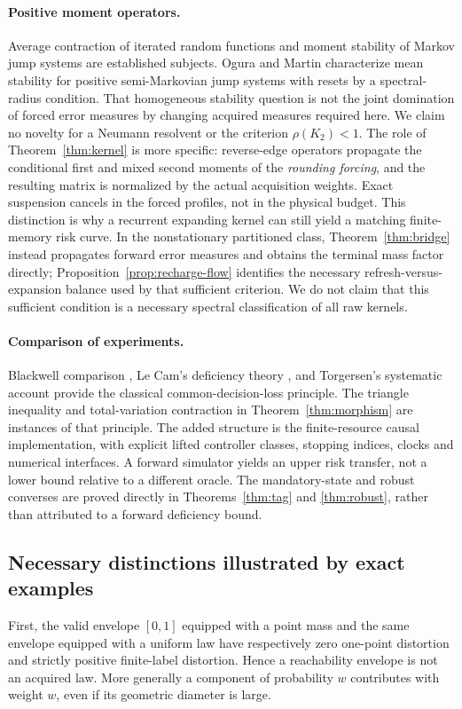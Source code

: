 \paragraph{Positive moment operators.}
Average contraction of iterated random functions \cite{diaconis} and moment stability of Markov jump systems \cite{costa} are established subjects. Ogura and Martin \cite{ogura} characterize mean stability for positive semi-Markovian jump systems with resets by a spectral-radius condition. That homogeneous stability question is not the joint domination of forced error measures by changing acquired measures required here. We claim no novelty for a Neumann resolvent or the criterion $\rho(K_2)<1$. The role of Theorem~\ref{thm:kernel} is more specific: reverse-edge operators propagate the conditional first and mixed second moments of the \emph{rounding forcing}, and the resulting matrix is normalized by the actual acquisition weights. Exact suspension cancels in the forced profiles, not in the physical budget. This distinction is why a recurrent expanding kernel can still yield a matching finite-memory risk curve. In the nonstationary partitioned class, Theorem~\ref{thm:bridge} instead propagates forward error measures and obtains the terminal mass factor directly; Proposition~\ref{prop:recharge-flow} identifies the necessary refresh-versus-expansion balance used by that sufficient criterion. We do not claim that this sufficient condition is a necessary spectral classification of all raw kernels.

\paragraph{Comparison of experiments.}
Blackwell comparison \cite{blackwell}, Le Cam's deficiency theory \cite{lecam}, and Torgersen's systematic account \cite{torgersen} provide the classical common-decision-loss principle. The triangle inequality and total-variation contraction in Theorem~\ref{thm:morphism} are instances of that principle. The added structure is the finite-resource causal implementation, with explicit lifted controller classes, stopping indices, clocks and numerical interfaces. A forward simulator yields an upper risk transfer, not a lower bound relative to a different oracle. The mandatory-state and robust converses are proved directly in Theorems~\ref{thm:tag} and \ref{thm:robust}, rather than attributed to a forward deficiency bound.

\subsection{Necessary distinctions illustrated by exact examples}
First, the valid envelope $[0,1]$ equipped with a point mass and the same envelope equipped with a uniform law have respectively zero one-point distortion and strictly positive finite-label distortion. Hence a reachability envelope is not an acquired law. More generally a component of probability $w$ contributes with weight $w$, even if its geometric diameter is large.

